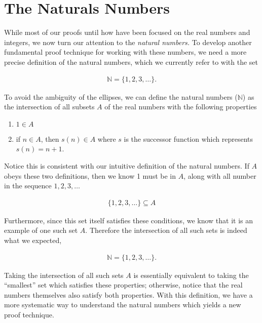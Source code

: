 \documentclass[twoside]{report}
\begin{document}
\section{The Naturals Numbers}

While most of our proofs until how have been focused on the real numbers and integers, we now turn our attention to the \emph{natural numbers.} To develop another fundamental proof technique for working with these numbers, we need a more precise definition of the natural numbers, which we currently refer to with the set

\begin{align*}
	\mathbb{N} = \{ 1, 2, 3, \dots \}.
\end{align*}

To avoid the ambiguity of the ellipses, we can define the natural numbers ($\mathbb{N}$) as the intersection of all subsets $A$ of the real numbers with the following properties

\vspace{\baselineskip}
\begin{enumerate}
	\item $1 \in A$
	\item if $n \in A$, then $s(n) \in A$ where $s$ is the successor function which represents $s(n) = n + 1$.
\end{enumerate}
\vspace{\baselineskip}

Notice this is consistent with our intuitive definition of the natural numbers. If $A$ obeys these two definitions, then we know 1 must be in $A$, along with all number in the sequence $1, 2, 3, \dots$

\begin{align*}
	\{ 1, 2, 3, \dots \} \subseteq A
\end{align*}

Furthermore, since this set itself satisfies these conditions, we know that it is an example of one such set $A$. Therefore the intersection of all such sets is indeed what we expected,

\begin{align*}
	\mathbb{N} = \{ 1, 2, 3, \dots \}.
\end{align*}

Taking the intersection of all such sets $A$ is essentially equivalent to taking the ``smallest'' set which satisfies these properties; otherwise, notice that the real numbers themselves also satisfy both properties. With this definition, we have a more systematic way to understand the natural numbers which yields a new proof technique.
\end{document}
